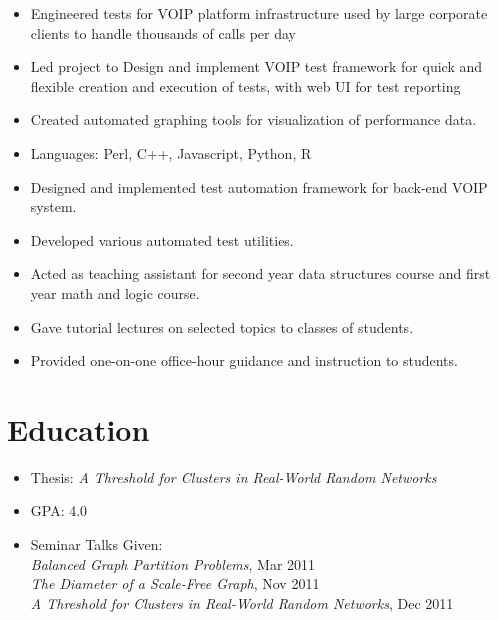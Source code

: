 \documentclass[11pt,a4paper,sans]{moderncv}
\begin{document}
{ \begin{itemize} \itemsep -1pt
  \item Engineered tests for VOIP platform infrastructure used by large corporate clients to handle thousands of calls per day\item Led project to Design and implement VOIP test framework for quick and flexible creation and execution of tests, with web UI for test reporting\item Created automated graphing tools for visualization of performance data.\item Languages: Perl, C++, Javascript, Python, R
\end{itemize} }
  
{ \begin{itemize} \itemsep -1pt
  \item Designed and implemented test automation framework for back-end VOIP system.\item Developed various automated test utilities.
\end{itemize} }
  
{ \begin{itemize} \itemsep -1pt
  \item Acted as teaching assistant for second year data structures course and first year math and logic course.\item Gave tutorial lectures on selected topics to classes of students.\item Provided one-on-one office-hour guidance and instruction to students.
\end{itemize} }
  

\section{\textbf{Education}}

{ \begin{itemize} \itemsep -1pt
  \item Thesis: \textit{A Threshold for Clusters in Real-World Random Networks}\item GPA: 4.0 \item Seminar Talks Given:
          \\ \textit{Balanced Graph Partition Problems}, Mar 2011
          \\ \textit{The Diameter of a Scale-Free Graph}, Nov 2011
          \\ \textit{A Threshold for Clusters in Real-World Random Networks}, Dec 2011
\end{itemize} }
  
\end{document}
